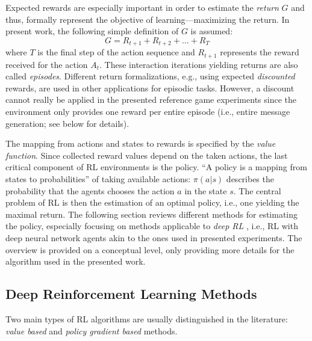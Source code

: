 Expected rewards are especially important in order to estimate the \textit{return} $G$ and thus, formally represent the objective of learning---maximizing the return. In present work, the following simple definition of $G$ is assumed: 
\begin{equation}
G = R_{t+1} + R_{t+2} + ... + R_T
\end{equation}
where $T$ is the final step of the action sequence and $R_{t+1}$ represents the reward received for the action $A_t$. These interaction iterations yielding returns are also called \textit{episodes}. Different return formalizations, e.g., using expected \textit{discounted} rewards, are used in other applications for episodic tasks. However, a discount cannot really be applied in the presented reference game experiments since the environment only provides one reward per entire episode (i.e., entire message generation; see below for details).

The mapping from actions and states to rewards is specified by the \textit{value function}. Since collected reward values depend on the taken actions, the last critical component of RL environments is the policy. ``A policy is a mapping from states to probabilities'' of taking available actions: $\pi(a | s)$ describes the probability that the agents chooses the action $a$ in the state $s$. The central problem of RL is then the estimation of an optimal policy, i.e., one yielding the maximal return. The following section reviews different methods for estimating the policy, especially focusing on methods applicable to \textit{deep RL} \parencite{lecun2015deep}, i.e., RL with deep neural network agents akin to the ones used in presented experiments. The overview is provided on a conceptual level, only providing more details for the algorithm used in the presented work.

\subsection{Deep Reinforcement Learning Methods}
\label{rl_methods}
Two main types of RL algorithms are usually distinguished in the literature: \textit{value based} and \textit{policy gradient based} methods. 

